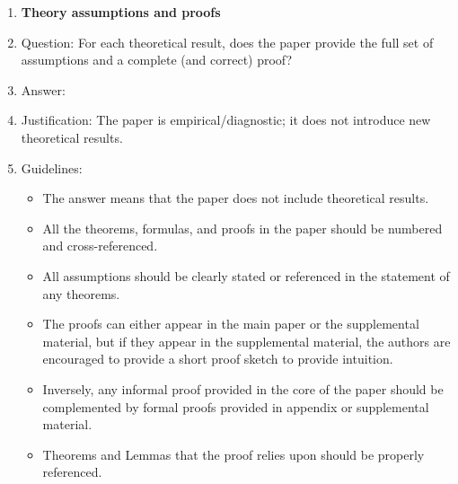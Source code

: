 \documentclass[11pt]{article}
\begin{document}
\begin{enumerate}
\item {\bf Theory assumptions and proofs}
    \item[] Question: For each theoretical result, does the paper provide the full set of assumptions and a complete (and correct) proof?
    \item[] Answer: \answerNA{}
    \item[] Justification: The paper is empirical/diagnostic; it does not introduce new theoretical results.
    \item[] Guidelines:
    \begin{itemize}
        \item The answer \answerNA{} means that the paper does not include theoretical results.
        \item All the theorems, formulas, and proofs in the paper should be numbered and cross-referenced.
        \item All assumptions should be clearly stated or referenced in the statement of any theorems.
        \item The proofs can either appear in the main paper or the supplemental material, but if they appear in the supplemental material, the authors are encouraged to provide a short proof sketch to provide intuition.
        \item Inversely, any informal proof provided in the core of the paper should be complemented by formal proofs provided in appendix or supplemental material.
        \item Theorems and Lemmas that the proof relies upon should be properly referenced.
    \end{itemize}


\end{enumerate}
\end{document}
